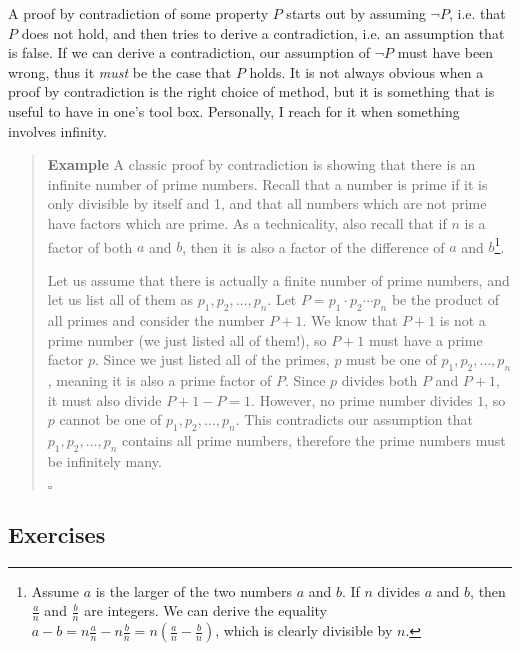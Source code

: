 \documentclass{tufte-handout}
\newcounter{example}
\newenvironment{example}
{\refstepcounter{example}\begin{quote}
\textbf{Example \arabic{example}}}
{

$\square$\end{quote}}
\begin{document}
A proof by contradiction of some property $P$ starts out by
assuming $\lnot P$, i.e. that $P$ does not hold, and then tries to
derive a contradiction, i.e. an assumption that is false. If we
can derive a contradiction, our assumption of $\lnot P$ must have
been wrong, thus it \emph{must} be the case that $P$ holds.
%
It is not always obvious when a proof by contradiction is the
right choice of method, but it is something that is useful to have
in one's tool box. Personally, I reach for it when something
involves infinity.

\begin{example}
  A classic proof by contradiction is showing that there is an
  infinite number of prime numbers. Recall that a number is prime
  if it is only divisible by itself and 1, and that all numbers
  which are not prime have factors which are prime. As a
  technicality, also recall that if $n$ is a factor of both $a$
  and $b$, then it is also a factor of the difference of $a$ and
  $b$\footnote{Assume $a$ is the larger of the two numbers $a$ and
    $b$. If $n$ divides $a$ and $b$, then $\frac{a}{n}$ and
    $\frac{b}{n}$ are integers. We can derive the equality
    $a - b = n\frac{a}{n} - n\frac{b}{n} = n(\frac{a}{n} -
    \frac{b}{n})$, which is clearly divisible by $n$.}.

  Let us assume that there is actually a finite number of prime
  numbers, and let us list all of them as $p_1, p_2, \dots,p_n$.
  Let $P = p_1\cdot p_2\cdots p_n$ be the product of all primes
  and consider the number $P + 1$. We know that $P + 1$ is not a
  prime number (we just listed all of them!), so $P + 1$ must have
  a prime factor $p$. Since we just listed all of the primes, $p$
  must be one of $p_1, p_2, \dots,p_n$, meaning it is also a prime
  factor of $P$. Since $p$ divides both $P$ and $P + 1$, it must
  also divide $P + 1 - P = 1$. However, no prime number divides
  $1$, so $p$ cannot be one of $p_1, p_2, \dots,p_n$. This
  contradicts our assumption that $p_1, p_2, \dots,p_n$ contains
  all prime numbers, therefore the prime numbers must be
  infinitely many.
\end{example}

\subsection{Exercises}
\end{document}

